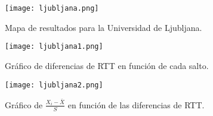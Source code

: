 \begin{figure}[H]
\texttt{[image: ljubljana.png]}
\caption{Mapa de resultados para la Universidad de Ljubljana.}
\label{mapa3}
\end{figure}

\begin{figure}[H]
\centering
\texttt{[image: ljubljana1.png]}
\caption{Gráfico de diferencias de RTT en función de cada salto.}
\label{diff3}
\end{figure}

\begin{figure}[H]
\centering
\texttt{[image: ljubljana2.png]}
\caption{Gráfico de $\frac{X_i - \bar{X}}{S}$ en función de las diferencias de RTT.}
\label{sdev3}
\end{figure}